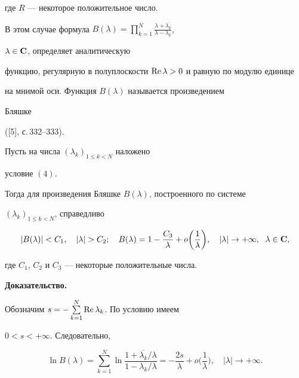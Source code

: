 где $R$ --- некоторое положительное число.


В этом случае формула $B(\lambda)=\prod \limits_{k=1}^{N}


\frac {\lambda +\overline {\lambda_k}}{\lambda -\lambda_k}$,


$\lambda \in \bold C$, определяет аналитическую


функцию, регулярную в полуплоскости $\operatorname{Re}\lambda>0$ и равную по модулю единице


на мнимой оси. Функция $B(\lambda)$ называется произведением


Бляшке\label{Blashke}


([5], с.\,332--333).





\begin{prop}


Пусть на числа $(\lambda_k)_{1\leq k<N}$ наложено


условие $(4)$.


Тогда для произведения Бляшке $B(\lambda)$, построенного по системе


$(\lambda_k)_{1\leq k<N}$, справедливо


$$


|B(\lambda)|<C_1,\quad |\lambda |>C_2;\quad


B(\lambda)=1-\frac {C_3}{\lambda}+o\bigg(\frac {1}{\lambda}\bigg),


\quad |\lambda |\to +\infty,\ \; \lambda \in \bold C,


$$


где $C_1$, $C_2$ и $C_3$ --- некоторые положительные числа.


\end{prop}








{\bf Доказательство.}


Обозначим $s=-\sum \limits_{k=1}^{N}\operatorname{Re}\lambda_k$. По условию имеем


$0<s<+\infty $. Следовательно,


$$


\ln B(\lambda)=\sum_{k=1}^{N}\ln


\frac{1+\overline{\lambda_k}/\lambda}{1-\lambda_k/\lambda}=


-\frac {2s}{\lambda}+


o\bigg(\frac {1}{\lambda}\bigg),\quad |\lambda |\to +\infty.


$$





